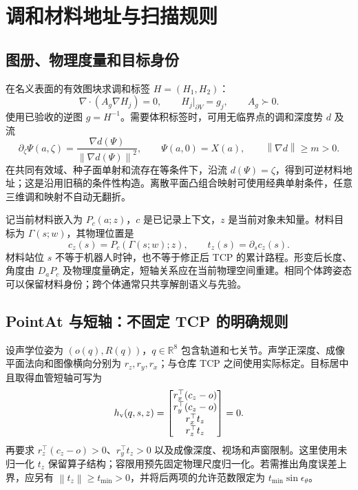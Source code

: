 \documentclass[UTF8,11pt,a4paper,fontset=fandol]{ctexart}
\numberwithin{equation}{section}
\theoremstyle{definition}
\newcommand{\R}{\mathbb R}
\newcommand{\norm}[1]{\left\lVert#1\right\rVert}
\begin{document}
\section{调和材料地址与扫描规则}
\label{sec:geometry}
\subsection{图册、物理度量和目标身份}
在名义表面的有效图块求调和标签 $H=(H_1,H_2)$：
\begin{equation}
 \nabla\!\cdot(A_g\nabla H_j)=0,\qquad H_j|_{\partial V}=g_j,\qquad A_g\succ0.
 \label{eq:harm}
\end{equation}
使用已验收的逆图 $g=H^{-1}$。需要体积标签时，可用无临界点的调和深度势 $d$ 及流
\begin{equation}
 \partial_\zeta\Psi(a,\zeta)=\frac{\nabla d(\Psi)}{\norm{\nabla d(\Psi)}^2},\qquad
 \Psi(a,0)=X(a),\qquad \norm{\nabla d}\ge m>0.
 \label{eq:flow}
\end{equation}
在共同有效域、种子面单射和流存在等条件下，沿流 $d(\Psi)=\zeta$，得到可逆材料地址；这是沿用旧稿的条件性构造。离散平面凸组合映射可使用经典单射条件，任意三维调和映射不自动无翻折\cite{floater2003,floater2006}。

记当前材料嵌入为 $P_c(a;z)$，$c$ 是已记录上下文，$z$ 是当前对象未知量。材料目标为 $\Gamma(s;w)$，其物理位置是
\begin{equation}
 c_z(s)=P_c(\Gamma(s;w);z),\qquad
 t_z(s)=\partial_s c_z(s).
 \label{eq:target}
\end{equation}
材料站位 $s$ 不等于机器人时钟，也不等于修正后 TCP 的累计路程。形变后长度、角度由 $D_aP_c$ 及物理度量确定，短轴关系应在当前物理空间重建。相同个体跨姿态可以保留材料身份；跨个体通常只共享解剖语义与先验。

\subsection{PointAt 与短轴：不固定 TCP 的明确规则}
设声学位姿为 $(o(q),R(q))$，$q\in\R^8$ 包含轨道和七关节。声学正深度、成像平面法向和图像横向分别为 $r_z,r_y,r_x$；与仓库 TCP 之间使用实际标定。目标居中且取得血管短轴可写为
\begin{equation}
 h_{\rm v}(q,s,z)=
 \begin{bmatrix}
 r_x^\top(c_z-o)\\ r_y^\top(c_z-o)\\
 r_x^\top t_z\\ r_z^\top t_z
 \end{bmatrix}=0.
 \label{eq:vesselrule}
\end{equation}
再要求 $r_z^\top(c_z-o)>0$、$r_y^\top t_z>0$ 以及成像深度、视场和声窗限制。这里使用未归一化 $t_z$ 保留算子结构；容限用预先固定物理尺度归一化。若需推出角度误差上界，应另有 $\norm{t_z}\ge t_{\min}>0$，并将后两项的允许范数限定为 $t_{\min}\sin\epsilon_\theta$。
\end{document}
